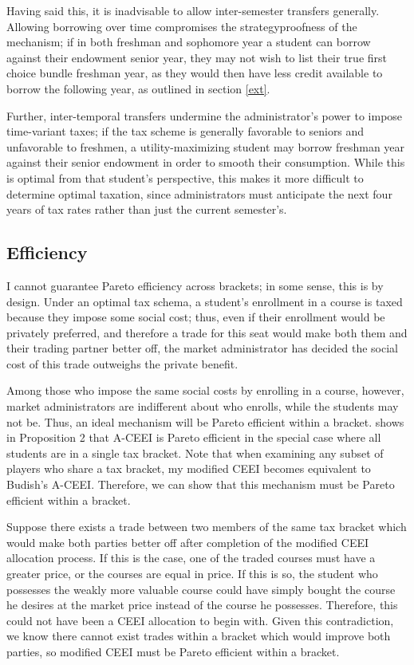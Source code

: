 \documentclass{article}
\begin{document}
Having said this, it is inadvisable to allow inter-semester transfers generally. Allowing borrowing over time compromises the strategyproofness of the mechanism; if in both freshman and sophomore year a student can borrow against their endowment senior year, they may not wish to list their true first choice bundle freshman year, as they would then have less credit available to borrow the following year, as outlined in section \ref{ext}. 

Further, inter-temporal transfers undermine the administrator's power to impose time-variant taxes; if the tax scheme is generally favorable to seniors and unfavorable to freshmen, a utility-maximizing student may borrow freshman year against their senior endowment in order to smooth their consumption. While this is optimal from that student's perspective, this makes it more difficult to determine optimal taxation, since administrators must anticipate the next four years of tax rates rather than just the current semester's. 

\subsection{Efficiency}

I cannot guarantee Pareto efficiency across brackets; in some sense, this is by design. Under an optimal tax schema, a student's enrollment in a course is taxed because they impose some social cost; thus, even if their enrollment would be privately preferred, and therefore a trade for this seat would make both them and their trading partner better off, the market administrator has decided the social cost of this trade outweighs the private benefit. 

Among those who impose the same social costs by enrolling in a course, however, market administrators are indifferent about who enrolls, while the students may not be. Thus, an ideal mechanism will be Pareto efficient within a bracket. \textcite{budish2011} shows in Proposition 2 that A-CEEI is Pareto efficient in the special case where all students are in a single tax bracket. Note that when examining any subset of players who share a tax bracket, my modified CEEI becomes equivalent to Budish's A-CEEI. Therefore, we can show that this mechanism must be Pareto efficient within a bracket.

Suppose there exists a trade between two members of the same tax bracket which would make both parties better off after completion of the modified CEEI allocation process. If this is the case, one of the traded courses must have a greater price, or the courses are equal in price. If this is so, the student who possesses the weakly more valuable course could have simply bought the course he desires at the market price instead of the course he possesses. Therefore, this could not have been a CEEI allocation to begin with. Given this contradiction, we know there cannot exist trades within a bracket which would improve both parties, so modified CEEI must be Pareto efficient within a bracket.
\end{document}
